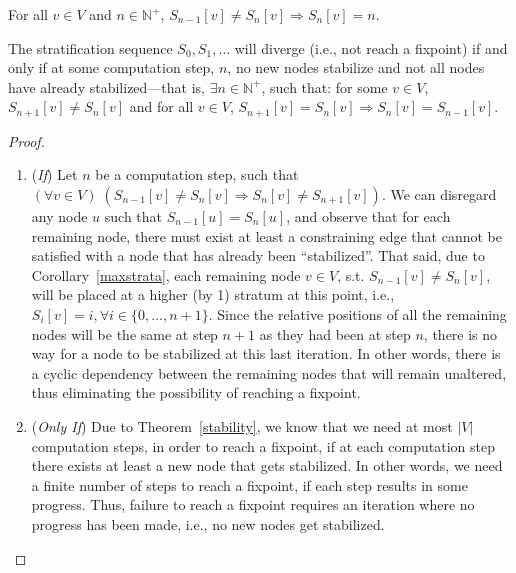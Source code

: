 \begin{corollary}\label{maxstrata}
  For all $v \in V$ and $n \in \mathbb{N}^+$, $S_{n-1}[v] \neq
  S_{n}[v] \Rightarrow S_{n}[v] = n$.
\end{corollary}

\begin{thm}\label{termination}
  The stratification sequence $S_0, S_1,\ldots$ will diverge (i.e.,
  not reach a
  fixpoint) if and only if at some computation step, $n$, no new nodes stabilize
  and not all nodes have
  already stabilized---that is, $\exists n
  \in \mathbb{N}^+$, such that: for some $v \in V$, $S_{n+1}[v] \neq
  S_{n}[v]$ and for all $v \in V$, $S_{n+1}[v] = S_{n}[v] \Rightarrow
  S_{n}[v] = S_{n-1}[v]$.
\end{thm}

\begin{proof}\hspace*{\fill}
  \begin{enumerate}
  \item (\emph{If}) Let $n$ be a computation step, such
    that $(\forall v \in V) \; (S_{n-1}[v] \neq S_{n}[v] \Rightarrow
    S_{n}[v] \neq S_{n+1}[v])$. We can disregard any node $u$ such
    that $S_{n-1}[u] = S_{n}[u]$, and observe that for each remaining
    node, there must exist at least a constraining edge that cannot be
    satisfied with a node that has already been ``stabilized''. That
    said, due to Corollary~\ref{maxstrata}, each remaining node $v \in
    V$, s.t. $S_{n-1}[v] \neq S_{n}[v]$, will be placed at a higher (by 1)
    stratum at this point, i.e., $S_{i}[v] = i, \forall i \in
    \{0,\ldots{},n+1\}$. Since the relative positions of all the
    remaining nodes will be the same at step $n+1$ as they had been at
    step $n$, there is no way for a node to be stabilized at this last
    iteration. In other words, there is a cyclic dependency between
    the remaining nodes that will remain unaltered, thus eliminating
    the possibility of reaching a fixpoint.
  \item (\emph{Only If}) Due to Theorem~\ref{stability},
    we know that we need at most $|V|$ computation steps, in order to
    reach a fixpoint, if at each computation step there exists at
    least a new node that gets stabilized. In other words, we need a
    finite number of steps to reach a fixpoint, if each step results
    in some progress. Thus, failure to reach a fixpoint requires an
    iteration where no progress has been made, i.e., no new nodes get
    stabilized.
  \end{enumerate}
\end{proof}

